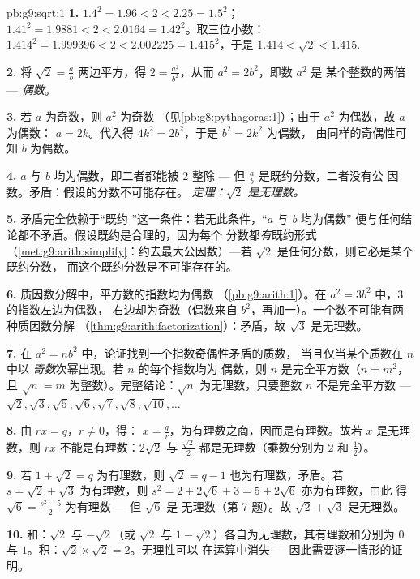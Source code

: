 \begin{solution}{pb:g9:sqrt:1}
\textbf{1.} $1.4^2 = 1.96 < 2 < 2.25 = 1.5^2$；
$1.41^2 = 1.9881 < 2 < 2.0164 = 1.42^2$。取三位小数：
$1.414^2 = 1.999396 < 2 < 2.002225 = 1.415^2$，于是
$1.414 < \sqrt2 < 1.415$.

\textbf{2.} 将 $\sqrt2 = \frac ab$ 两边平方，得
$2 = \frac{a^2}{b^2}$，从而 $a^2 = 2b^2$，即数 $a^2$ 是
某个整数的两倍 --- \emph{偶数}。

\textbf{3.} 若 $a$ 为奇数，则 $a^2$ 为奇数
（见\cref{pb:g8:pythagoras:1}）；由于 $a^2$ 为偶数，故 $a$ 为偶数：
$a = 2k$。代入得 $4k^2 = 2b^2$，于是 $b^2 = 2k^2$ 为偶数，
由同样的奇偶性可知 $b$ 为偶数。

\textbf{4.} $a$ 与 $b$ 均为偶数，即二者都能被 $2$ 整除
--- 但 $\frac ab$ 是既约分数，二者没有公
因数。矛盾：假设的分数不可能存在。
\emph{定理：$\sqrt2$ 是无理数。}

\textbf{5.} 矛盾完全依赖于“既约
”这一条件：若无此条件，“$a$ 与 $b$ 均为偶数”
便与任何结论都不矛盾。假设既约是合理的，因为每个
分数都\emph{有}既约形式
（\cref{met:g9:arith:simplify}：约去最大公因数）---若
$\sqrt2$ 是任何分数，则它必是某个既约分数，
而这个既约分数是不可能存在的。

\textbf{6.} 质因数分解中，平方数的指数均为偶数
（\cref{pb:g9:arith:1}）。在 $a^2 = 3b^2$ 中，$3$ 的指数左边为偶数，
右边却为奇数（偶数来自
$b^2$，再加一）。一个数不可能有两种质因数分解
（\cref{thm:g9:arith:factorization}）：矛盾，故
$\sqrt3$ 是无理数。

\textbf{7.} 在 $a^2 = n b^2$ 中，论证找到一个指数奇偶性矛盾的质数，
当且仅当某个质数在
$n$ 中以 \emph{奇数}次幂出现。若 $n$ 的每个指数均为
偶数，则 $n$ 是完全平方数（$n = m^2$，且
$\sqrt n = m$ 为整数）。完整结论：$\sqrt n$
为无理数，只要整数 $n$ 不是完全平方数 ---
$\sqrt2, \sqrt3, \sqrt5, \sqrt6, \sqrt7, \sqrt8, \sqrt{10},
\dots$

\textbf{8.} 由 $r x = q$，$r \neq 0$，得：
$x = \frac qr$，为有理数之商，因而是有理数。故若
$x$ 是无理数，则 $r x$ 不能是有理数：$2\sqrt2$ 与
$\frac{\sqrt2}{2}$ 都是无理数（乘数分别为 $2$ 和
$\frac12$）。

\textbf{9.} 若 $1 + \sqrt2 = q$ 为有理数，则
$\sqrt2 = q - 1$ 也为有理数，矛盾。若
$s = \sqrt2 + \sqrt3$ 为有理数，则
$s^2 = 2 + 2\sqrt6 + 3 = 5 + 2\sqrt6$ 亦为有理数，由此
得 $\sqrt6 = \frac{s^2 - 5}{2}$ 为有理数 --- 但 $\sqrt6$ 是
无理数（第 7 题）。故 $\sqrt2 + \sqrt3$ 是无理数。

\textbf{10.} 和：$\sqrt2$ 与 $-\sqrt2$（或 $\sqrt2$ 与
$1 - \sqrt2$）各自为无理数，其有理数和分别为 $0$ 与
$1$。积：$\sqrt2 \times \sqrt2 = 2$。无理性可以
在运算中消失 --- 因此需要逐一情形的证明。


\end{solution}
